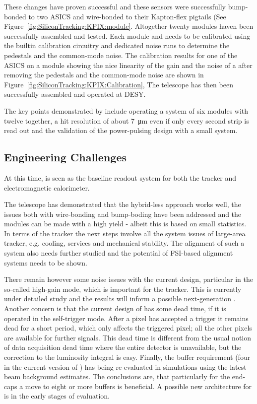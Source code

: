 These changes have proven successful and these sensors were successfully bump-bonded to two \KPIX ASICS and wire-bonded to their Kapton-flex pigtails 
(See Figure~\ref{fig:SiliconTracking:KPIX:module}. Altogether twenty modules haven been successfully assembled and tested. 
Each module and \KPIX needs to be calibrated using the builtin calibration circuitry and dedicated noise runs to determine the pedestals and the 
common-mode noise.  The calibration results for one of the \KPIX ASICS on a module  showing the nice linearity of the 
\KPIX gain and the noise of a \KPIX after removing the pedestals and the common-mode noise are shown in Figure~\ref{fig:SiliconTracking:KPIX:Calibration},
The \LYCORIS telescope has then been successfully assembled and operated at DESY. 



The key points demonstrated by \LYCORIS include operating a system of six modules with twelve \KPIX together, 
a hit resolution of about \SI{7}{\micro\meter} even if only every second strip is read out and the 
validation of the power-pulsing design with a small system. 



\subsection{Engineering Challenges}
At this time, \KPIX is seen as the baseline readout system for both the \SID tracker and electromagnetic calorimeter. 

The \LYCORIS telescope has demonstrated that the hybrid-less approach works well, the issues both with wire-bonding and 
bump-boding have been addressed and the modules can be made with a high yield - albeit this is based on small statistics.
In terms of the \SID tracker the next steps involve all the system issues of large-area tracker, e.g. cooling, services and mechanical stability. 
The alignment of such a system also needs further studied and the potential of FSI-based alignment systems needs to be shown. 

There remain however some noise issues with the current \KPIX design, particular in the so-called high-gain mode, 
which is important for the tracker. This is currently under detailed study and the results will inform a possible 
next-generation \KPIX. Another concern is that the current design of \KPIX has some dead time, if it is operated in the self-trigger mode. 
After a pixel has accepted a trigger it remains dead for a short period, which only affects the triggered pixel; all the other 
pixels are available for further signals. This dead time is different from the usual 
notion of data acquisition dead time where the entire detector is unavailable, 
but the correction to the luminosity integral is easy. Finally, the buffer 
requirement (four in the current version of \KPIX) has being re-evaluated in \SID  
simulations using the latest beam background estimates. The conclusions are, that particularly for 
the end-caps a move to eight or more buffers is beneficial. A possible new architecture for \KPIX is in 
the early stages of evaluation.


